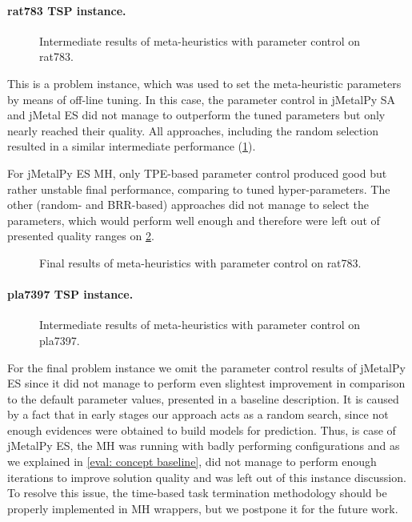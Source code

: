 \newpage
\paragraph{rat783 TSP instance.}
\begin{figure}[t]
	\centering
	
	\caption{Intermediate results of meta-heuristics with parameter control on rat783.}
	\label{eval:pict:pc:rat783 intermediate}
\end{figure}

This is a problem instance, which was used to set the meta-heuristic parameters by means of off-line tuning. In this case, the parameter control in jMetalPy SA and jMetal ES did not manage to outperform the tuned parameters but only nearly reached their quality. All approaches, including the random selection resulted in a similar intermediate performance (\cref{eval:pict:pc:rat783 intermediate}).

For jMetalPy ES MH, only TPE-based parameter control produced good but rather unstable final performance, comparing to tuned hyper-parameters. The other (random- and BRR-based) approaches did not manage to select the parameters, which would perform well enough and therefore were left out of presented quality ranges on \cref{eval:pict:pc:rat783 final}.

\begin{figure}[b]
	\centering
	
	\caption{Final results of meta-heuristics with parameter control on rat783.}
	\label{eval:pict:pc:rat783 final}
\end{figure}

\newpage
\paragraph{pla7397 TSP instance.}
\begin{figure}[t]
	\centering
	
	\caption{Intermediate results of meta-heuristics with parameter control on pla7397.}
	\label{eval:pict:pc:pla7397 intermediate}
\end{figure}

For the final problem instance we omit the parameter control results of jMetalPy ES since it did not manage to perform even slightest improvement in comparison to the default parameter values, presented in a baseline description. It is caused by a fact that in early stages our approach acts as a random search, since not enough evidences were obtained to build models for prediction. Thus, is case of jMetalPy ES, the MH was running with badly performing configurations and as we explained in \cref{eval: concept baseline}, did not manage to perform enough iterations to improve solution quality and was left out of this instance discussion. To resolve this issue, the time-based task termination methodology should be properly implemented in MH wrappers, but we postpone it for the future work.

